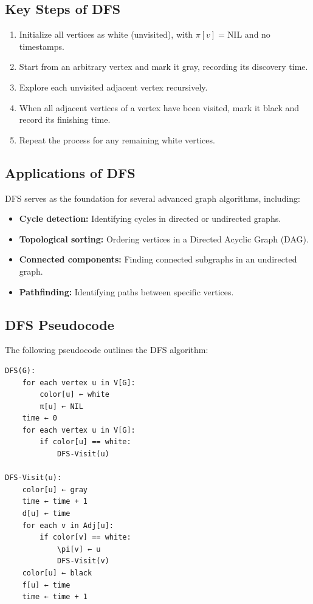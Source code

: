 \subsection{Key Steps of DFS}
\begin{enumerate}
    \item Initialize all vertices as white (unvisited), with \(\pi[v] = \text{NIL}\) and no timestamps.
    \item Start from an arbitrary vertex and mark it gray, recording its discovery time.
    \item Explore each unvisited adjacent vertex recursively.
    \item When all adjacent vertices of a vertex have been visited, mark it black and record its finishing time.
    \item Repeat the process for any remaining white vertices.
\end{enumerate}

\subsection{Applications of DFS}
DFS serves as the foundation for several advanced graph algorithms, including:
\begin{itemize}
    \item \textbf{Cycle detection:} Identifying cycles in directed or undirected graphs.
    \item \textbf{Topological sorting:} Ordering vertices in a Directed Acyclic Graph (DAG).
    \item \textbf{Connected components:} Finding connected subgraphs in an undirected graph.
    \item \textbf{Pathfinding:} Identifying paths between specific vertices.
\end{itemize}

\subsection{DFS Pseudocode}
The following pseudocode outlines the DFS algorithm:
\begin{verbatim}
DFS(G):
    for each vertex u in V[G]:
        color[u] ← white
        π[u] ← NIL
    time ← 0
    for each vertex u in V[G]:
        if color[u] == white:
            DFS-Visit(u)

DFS-Visit(u):
    color[u] ← gray
    time ← time + 1
    d[u] ← time
    for each v in Adj[u]:
        if color[v] == white:
            \pi[v] ← u
            DFS-Visit(v)
    color[u] ← black
    f[u] ← time
    time ← time + 1
\end{verbatim}

